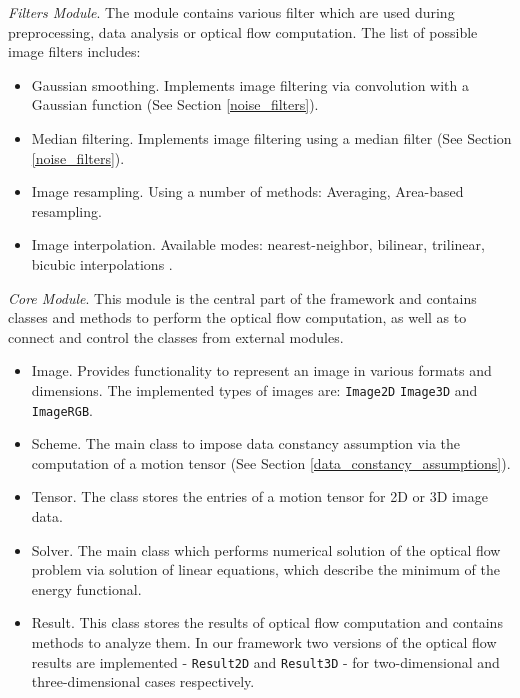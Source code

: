 \textit{Filters Module}. The module contains various filter which are used during preprocessing, data analysis or optical flow computation. The list of possible image filters includes:
\begin{itemize}
	\item Gaussian smoothing. Implements image filtering via convolution with a Gaussian function  (See Section \ref{noise_filters}).
	\item Median filtering. Implements image filtering using a median filter (See Section \ref{noise_filters}).
	\item Image resampling. Using a number of methods: Averaging, Area-based resampling.
	\item Image interpolation. Available modes: nearest-neighbor, bilinear, trilinear, bicubic interpolations \cite{Parker83}. 
\end{itemize}

\textit{Core Module}.  This module is the central part of the framework and contains classes and methods to perform the optical flow computation, as well as to connect and control the classes from external modules. 
\begin{itemize}
	\item Image. Provides functionality to represent an image in various formats and dimensions. The implemented types of images are: \texttt{Image2D} \texttt{Image3D} and \texttt{ImageRGB}.
	\item Scheme. The main class to impose data constancy assumption via the computation of a motion tensor (See Section \ref{data_constancy_assumptions}). 
	\item Tensor. The class stores the entries of a motion tensor for 2D or 3D image data.
	\item Solver. The main class which performs numerical solution of the optical flow problem via solution of linear equations, which describe the minimum of the energy functional.
	\item Result. This class stores the results of optical flow computation and contains methods to analyze them. In our framework two versions of the optical flow results are implemented - \texttt{Result2D} and \texttt{Result3D} - for two-dimensional and three-dimensional cases respectively.  
\end{itemize}

